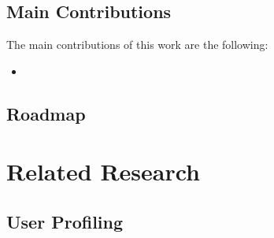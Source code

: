 \documentclass[11pt,oneside]{book}
\let\Oldsection\section
\renewcommand{\section}{\FloatBarrier\Oldsection}
\begin{document}
\section{Main Contributions}
\label{sub:contributions}
The main contributions of this work are the following:
\begin{itemize}
\renewcommand{\labelitemi}{$\bullet$} 
\item 
\end{itemize}

\section{Roadmap}
\label{sub:roadmap}


\chapter{Related Research}
\label{sec:related}


\section{User Profiling}
\end{document}
